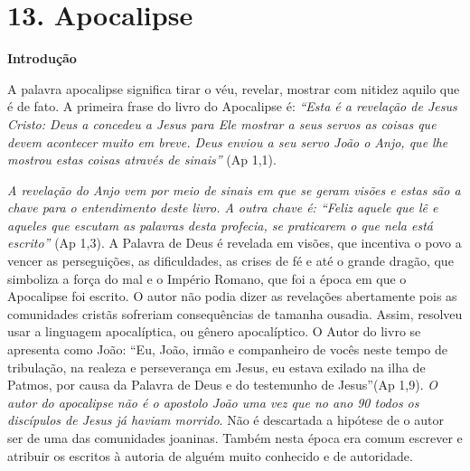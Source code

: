 \documentclass[
]{book}
\begin{document}
\hypertarget{apocalipse}{%
\section*{13. Apocalipse}\label{apocalipse}}

\textbf{Introdução}

A palavra apocalipse significa tirar o véu, revelar, mostrar com nitidez aquilo que é de fato. A primeira frase do livro do Apocalipse é: \emph{``Esta é a revelação de Jesus Cristo: Deus a concedeu a Jesus para Ele mostrar a seus servos as coisas que devem acontecer muito em breve. Deus enviou a seu servo João o Anjo, que lhe mostrou estas coisas através de sinais''} (Ap 1,1).

\emph{A revelação do Anjo vem por meio de sinais em que se geram visões e estas são a chave para o entendimento deste livro. A outra chave é: ``Feliz aquele que lê e aqueles que escutam as palavras desta profecia, se praticarem o que nela está escrito''} (Ap 1,3). A Palavra de Deus é revelada em visões, que incentiva o povo a vencer as perseguições, as dificuldades, as crises de fé e até o grande dragão, que simboliza a força do mal e o Império Romano, que foi a época em que o Apocalipse foi escrito. O autor não podia dizer as revelações abertamente pois as comunidades cristãs sofreriam consequências de tamanha ousadia. Assim, resolveu usar a linguagem apocalíptica, ou gênero apocalíptico. O Autor do livro se apresenta como João: ``Eu, João, irmão e companheiro de vocês neste tempo de tribulação, na realeza e perseverança em Jesus, eu estava exilado na ilha de Patmos, por causa da Palavra de Deus e do testemunho de Jesus''(Ap 1,9). \emph{O autor do apocalipse não é o apostolo João uma vez que no ano 90 todos os discípulos de Jesus já haviam morrido}. Não é descartada a hipótese de o autor ser de uma das comunidades joaninas. Também nesta época era comum escrever e atribuir os escritos à autoria de alguém muito conhecido e de autoridade.
\end{document}

